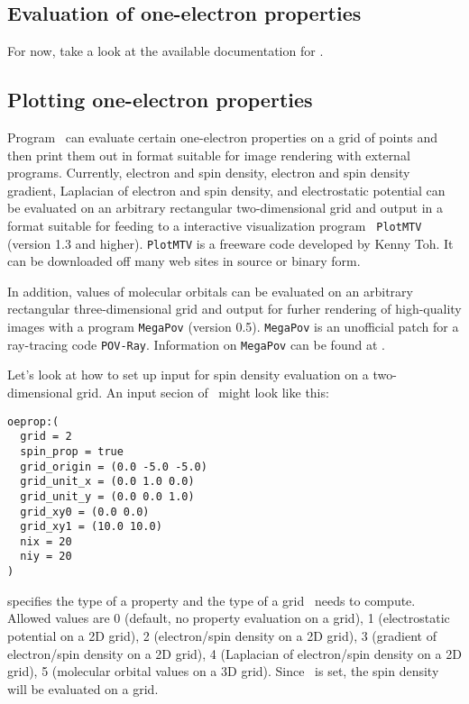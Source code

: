 \subsection{Evaluation of one-electron properties}
For now, take a look at the available documentation for \PSIoeprop .

\subsection{Plotting one-electron properties}
Program \PSIoeprop\ can evaluate certain one-electron properties on a
grid of points and then print them out in format suitable for image
rendering with external programs.  Currently, electron and spin
density, electron and spin density gradient, Laplacian of electron and
spin density, and electrostatic potential can be evaluated on an
arbitrary rectangular two-dimensional grid and output in a format
suitable for feeding to a interactive visualization program {\tt
PlotMTV} (version 1.3 and higher).  {\tt PlotMTV} is a freeware code
developed by Kenny Toh. It can be downloaded off many web sites in
source or binary form.

In addition, values of molecular orbitals can be evaluated on an
arbitrary rectangular three-dimensional grid and output for furher
rendering of high-quality images with a program {\tt MegaPov} (version
0.5).  {\tt MegaPov} is an unofficial patch for a ray-tracing code
{\tt POV-Ray}. Information on {\tt MegaPov} can be found at
.

Let's look at how to set up input for spin density evaluation on a
two-dimensional grid.  An input secion of \PSIoeprop\ might look like
this:
\begin{verbatim}
oeprop:(
  grid = 2
  spin_prop = true
  grid_origin = (0.0 -5.0 -5.0)
  grid_unit_x = (0.0 1.0 0.0)
  grid_unit_y = (0.0 0.0 1.0)
  grid_xy0 = (0.0 0.0)
  grid_xy1 = (10.0 10.0)
  nix = 20
  niy = 20
)
\end{verbatim}
 specifies the type of a property and the type of a grid
\PSIoeprop\ needs to compute.  Allowed values are 0 (default, no
property evaluation on a grid), 1 (electrostatic potential on a 2D
grid), 2 (electron/spin density on a 2D grid), 3 (gradient of
electron/spin density on a 2D grid), 4 (Laplacian of electron/spin
density on a 2D grid), 5 (molecular orbital values on a 3D
grid). Since \ is set, the spin density will be
evaluated on a grid.

